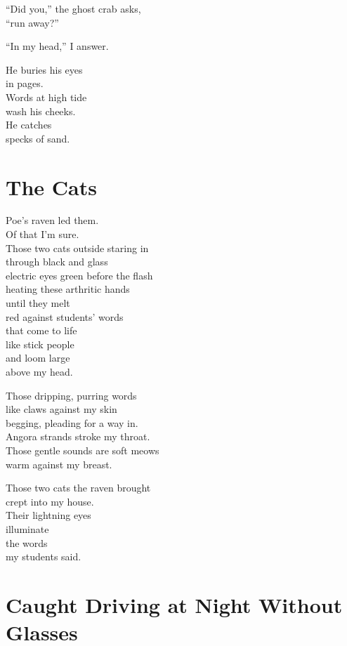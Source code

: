 \documentclass[twoside,10pt]{book}
\begin{document}
``Did you,'' the ghost crab asks,\\
``run away?''

``In my head,'' I answer.

He buries his eyes\\
in pages.\\
Words at high tide\\
wash his cheeks.\\
He catches\\
specks of sand.


\clearpage
\section{The Cats}

Poe's raven led them.\\
Of that I'm sure.\\
Those two cats outside staring in\\
through black and glass\\
electric eyes green before the flash\\
heating these arthritic hands\\
until they melt\\
red against students' words\\
that come to life\\
like stick people\\
and loom large\\
above my head.

Those dripping, purring words\\
like claws against my skin\\
begging, pleading for a way in.\\
Angora strands stroke my throat.\\
Those gentle sounds are soft meows\\
warm against my breast.

Those two cats the raven brought\\
crept into my house.\\
Their lightning eyes\\
illuminate\\
the words\\
my students said.


\clearpage
\section{Caught Driving at Night Without Glasses}
\end{document}
